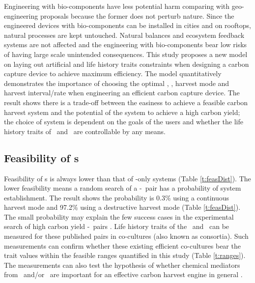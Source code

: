 \documentclass[../thesis.tex]{subfiles} %
\begin{document}
Engineering with bio-components have less potential harm comparing with geo-engineering proposals because the former does not perturb nature.  Since the engineered devices with bio-components can be installed in cities and on rooftops, natural processes are kept untouched.  Natural balances and ecosystem feedback systems are not affected and the engineering with bio-components bear low risks of having large scale unintended consequences.  This study proposes a new model on laying out artificial and life history traits constraints when designing a carbon capture device to achieve maximum efficiency.  The model quantitatively demonstrates the importance of choosing the optimal \phy, \bac, harvest mode and harvest interval/rate when engineering an efficient carbon capture device.  The result shows there is a trade-off between the easiness to achieve a feasible carbon harvest system and the potential of the system to achieve a high carbon yield; the choice of system is dependent on the goals of the users and whether the life history traits of \phy\ and \bac\ are controllable by any means.

\subsection{Feasibility of \pbs s}
Feasibility of \pbs s is always lower than that of \phy-only systems (Table \ref{t:feasDist}).  The lower feasibility means a random search of a \phy-\bac\ pair has a probability of system establishment.  The result shows the probability is 0.3\% using a continuous harvest mode and 97.2\% using a destructive harvest mode (Table \ref{t:feasDist}).  The small probability may explain the few success cases in the experimental search of high carbon yield \phy-\bac\ pairs \autocite{fuentes2016impact}.  Life history traits of the \phy\ and \bac\ can be measured for these published pairs in co-cultures (also known as consortia).  Such measurements can confirm whether these existing efficient co-cultures bear the trait values within the feasible ranges quantified in this study (Table \ref{t:ranges}).  The measurements can also test the hypothesis of whether chemical mediators from \phy\ and/or \bac\ are important for an effective carbon harvest engine in general \autocite{rivas2010interactions,amin2009photolysis,fuentes2016impact}.
\end{document}
